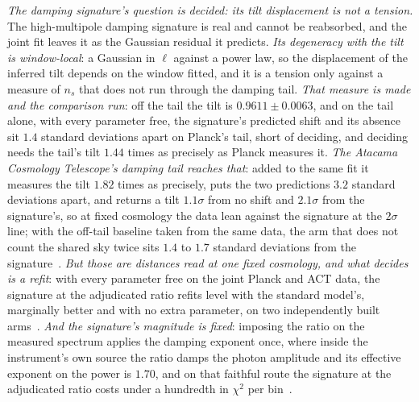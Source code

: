 \documentclass[11pt,a4paper]{article}
\theoremstyle{plain}
\theoremstyle{definition}
\begin{document}
\emph{The damping signature's question is decided: its tilt displacement is not a tension.} The
high-multipole damping signature is real and cannot be reabsorbed, and the joint fit leaves it as the Gaussian
residual it predicts. \emph{Its degeneracy with the tilt is window-local}: a Gaussian in $\ell$ against a power
law, so the displacement of the inferred tilt depends on the window fitted, and it is a tension only against a
measure of $n_s$ that does not run through the damping tail. \emph{That measure is made and the comparison
run}: off the tail the tilt is $0.9611\pm0.0063$, and on the tail alone, with every parameter free, the
signature's predicted shift and its absence sit $1.4$ standard deviations apart on Planck's tail, short of
deciding, and deciding needs the tail's tilt $1.44$ times as precisely as Planck measures it. \emph{The Atacama
Cosmology Telescope's damping tail reaches that}: added to the same fit it measures the tilt $1.82$ times as
precisely, puts the two predictions $3.2$ standard deviations apart, and returns a tilt $1.1\sigma$ from no shift and $2.1\sigma$
from the signature's, so at fixed cosmology the data lean against the signature at the $2\sigma$ line;
with the off-tail baseline taken from the same data, the arm that does not count the shared sky twice sits $1.4$
to $1.7$ standard deviations from the signature~\cite{JanzenCRcosmology}. \emph{But those are distances read at
one fixed cosmology, and what decides is a refit}: with every parameter free on the joint Planck and ACT data,
the signature at the adjudicated ratio refits level with the standard model's, marginally better and with no
extra parameter, on two independently built arms~\cite{JanzenCRcosmology}. \emph{And the signature's magnitude is fixed}: imposing
the ratio on the measured spectrum applies the damping exponent once, where inside the instrument's own source the
ratio damps the photon amplitude and its effective exponent on the power is $1.70$, and on that faithful route the
signature at the adjudicated ratio costs under a hundredth in $\chi^{2}$ per bin~\cite{JanzenCRcosmology}.
\end{document}

